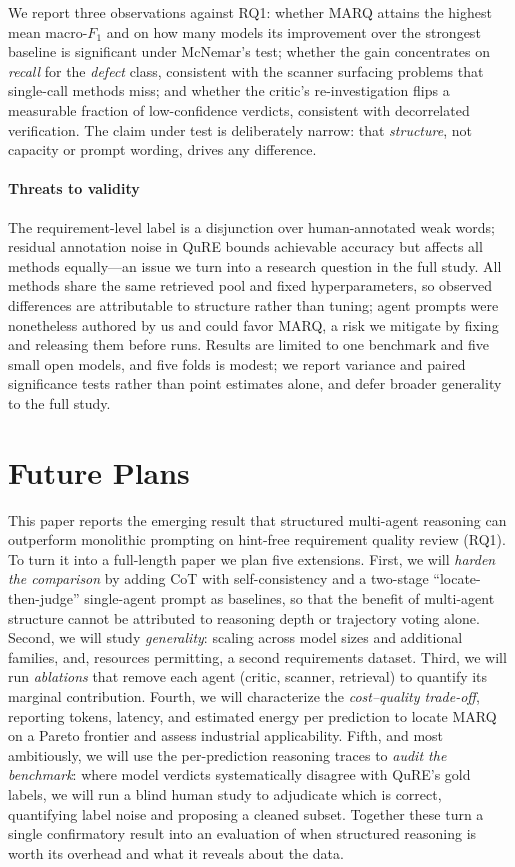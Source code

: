 \documentclass[10pt,conference]{IEEEtran}
\begin{document}
We report three observations against RQ1: whether MARQ attains the highest mean macro-$F_1$ and on how many models its improvement over the strongest baseline is significant under McNemar's test; whether the gain concentrates on \emph{recall} for the \emph{defect} class, consistent with the scanner surfacing problems that single-call methods miss; and whether the critic's re-investigation flips a measurable fraction of low-confidence verdicts, consistent with decorrelated verification. The claim under test is deliberately narrow: that \emph{structure}, not capacity or prompt wording, drives any difference.

\paragraph*{Threats to validity}
The requirement-level label is a disjunction over human-annotated weak words; residual annotation noise in QuRE bounds achievable accuracy but affects all methods equally---an issue we turn into a research question in the full study. All methods share the same retrieved pool and fixed hyperparameters, so observed differences are attributable to structure rather than tuning; agent prompts were nonetheless authored by us and could favor MARQ, a risk we mitigate by fixing and releasing them before runs. Results are limited to one benchmark and five small open models, and five folds is modest; we report variance and paired significance tests rather than point estimates alone, and defer broader generality to the full study.

\section{Future Plans}
\label{sec:future}
This paper reports the emerging result that structured multi-agent reasoning can outperform monolithic prompting on hint-free requirement quality review (RQ1). To turn it into a full-length paper we plan five extensions. First, we will \emph{harden the comparison} by adding CoT with self-consistency and a two-stage ``locate-then-judge'' single-agent prompt as baselines, so that the benefit of multi-agent structure cannot be attributed to reasoning depth or trajectory voting alone. Second, we will study \emph{generality}: scaling across model sizes and additional families, and, resources permitting, a second requirements dataset. Third, we will run \emph{ablations} that remove each agent (critic, scanner, retrieval) to quantify its marginal contribution. Fourth, we will characterize the \emph{cost--quality trade-off}, reporting tokens, latency, and estimated energy per prediction to locate MARQ on a Pareto frontier and assess industrial applicability. Fifth, and most ambitiously, we will use the per-prediction reasoning traces to \emph{audit the benchmark}: where model verdicts systematically disagree with QuRE's gold labels, we will run a blind human study to adjudicate which is correct, quantifying label noise and proposing a cleaned subset. Together these turn a single confirmatory result into an evaluation of when structured reasoning is worth its overhead and what it reveals about the data.
\end{document}
